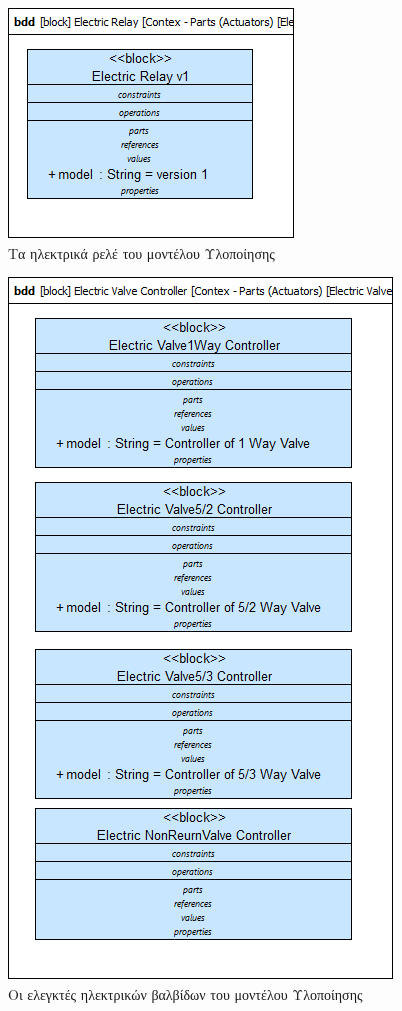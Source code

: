 \documentclass[a4paper,12pt,twoside]{report}
\begin{document}
{\begin{appendices}
				\begin{figure}[hp]
					\centering
					\includegraphics[scale=0.50]{DesignModel_Contex-Parts(ActuatorUnits)[ElectricRelays].png}
					\caption{Τα ηλεκτρικά ρελέ του μοντέλου Υλοποίησης}
					\label{φωτ:Τα ηλεκτρικά ρελέ του μοντέλου Υλοποίησης}
				\end{figure}
				
				\begin{figure}[hp]
					\centering
					\includegraphics[scale=0.50]{DesignModel_Contex-Parts(ActuatorUnits)[ElectricValveControllers].png}
					\caption{Οι ελεγκτές ηλεκτρικών βαλβίδων του μοντέλου Υλοποίησης}
					\label{φωτ:Οι ελεγκτές ηλεκτρικών βαλβίδων του μοντέλου Υλοποίησης}
				\end{figure}
				

\end{appendices}}
\end{document}
